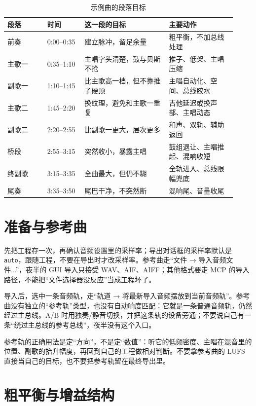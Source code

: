 \begin{table}[htbp]
\centering
\small
\begin{tabular}{@{}p{0.16\linewidth}p{0.15\linewidth}p{0.34\linewidth}p{0.27\linewidth}@{}}
\hline
段落 & 时间 & 这一段的目标 & 主要动作 \\
\hline
前奏 & 0:00--0:35 & 建立脉冲，留足余量 & 粗平衡，不加总线处理 \\
主歌一 & 0:35--1:10 & 主唱字头清楚，鼓与贝斯不抢 & 推子、低架、主唱压缩 \\
副歌一 & 1:10--1:45 & 比主歌高一档，但不靠推子硬顶 & 主唱自动化、空间、总线胶水 \\
主歌二 & 1:45--2:20 & 换纹理，避免和主歌一重复 & 吉他延迟或换声部、主唱动态 \\
副歌二 & 2:20--2:55 & 比副歌一更大，层次更多 & 和声、双轨、辅助返回 \\
桥段 & 2:55--3:15 & 突然收小，暴露主唱 & 鼓组退让、主唱推起、混响收短 \\
终副歌 & 3:15--3:35 & 全曲最大，但仍不糊 & 全轨进入、总线限幅兜底 \\
尾奏 & 3:35--3:50 & 尾巴干净，不突然断 & 混响尾、音量收尾 \\
\hline
\end{tabular}
\caption{示例曲的段落目标}
\label{tab:walk-sections}
\end{table}

\section{准备与参考曲}

先把工程存一次，再确认音频设置里的采样率；导出对话框的采样率默认是 \texttt{auto}，跟随工程，不要在导出时才改采样率。参考曲走“文件 → 导入音频文件...”，夜半的 GUI 导入只接受 WAV、AIF、AIFF；其他格式要走 MCP 的导入路径，不能把“文件选择器没反应”当成工程坏了。

导入后，选中一条音频轨，走“轨道 → 将最新导入音频摆放到当前音频轨”。参考曲没有独立的“参考轨”类型，也没有自动响度匹配：它就是一条普通音频轨，仍然经过主总线。A/B 时用独奏/静音切换，并把这条轨的设备旁通；不要说自己有一条“绕过主总线的参考总线”，夜半没有这个入口。

参考轨的正确用法是定“方向”，不是定“数值”：听它的低频密度、主唱在混音里的位置、副歌的抬升幅度，再回到自己的工程做相对判断。不要拿参考曲的 LUFS 直接当自己的目标，也不要把参考轨留在最终导出里。

\section{粗平衡与增益结构}

